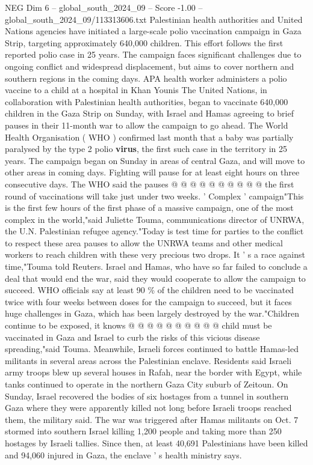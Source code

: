 \begin{textsample}{NEG Dim 6 – global\_south\_2024\_09 – Score -1.00 – global\_south\_2024\_09/113313606.txt}  \label{ex:f6_neg_039}
Palestinian health authorities and United Nations agencies have initiated a large-scale polio vaccination campaign in Gaza Strip, targeting approximately 640,000 children.
This effort follows the first reported polio case in 25 years.
The campaign faces significant challenges due to ongoing conflict and widespread displacement, but aims to cover northern and southern regions in the coming days.
APA health worker administers a polio vaccine to a child at a hospital in Khan Younis The United Nations, in collaboration with Palestinian health authorities, began to vaccinate 640,000 children in the Gaza Strip on Sunday, with Israel and Hamas agreeing to brief pauses in their 11-month war to allow the campaign to go ahead.
The World Health Organisation ( WHO ) confirmed last month that a baby was partially paralysed by the type 2 polio \textbf{virus}, the first such case in the territory in 25 years.
The campaign began on Sunday in areas of central Gaza, and will move to other areas in coming days.
Fighting will pause for at least eight hours on three consecutive days.
The WHO said the pauses @ @ @ @ @ @ @ @ @ @ the first round of vaccinations will take just under two weeks. ' Complex ' campaign"This is the first few hours of the first phase of a massive campaign, one of the most complex in the world,"said Juliette Touma, communications director of UNRWA, the U.N.
Palestinian refugee agency."Today is test time for parties to the conflict to respect these area pauses to allow the UNRWA teams and other medical workers to reach children with these very precious two drops.
It ' s a race against time,"Touma told Reuters.
Israel and Hamas, who have so far failed to conclude a deal that would end the war, said they would cooperate to allow the campaign to succeed.
WHO officials say at least 90 \% of the children need to be vaccinated twice with four weeks between doses for the campaign to succeed, but it faces huge challenges in Gaza, which has been largely destroyed by the war."Children continue to be exposed, it knows @ @ @ @ @ @ @ @ @ @ child must be vaccinated in Gaza and Israel to curb the risks of this vicious disease spreading,"said Touma.
Meanwhile, Israeli forces continued to battle Hamas-led militants in several areas across the Palestinian enclave.
Residents said Israeli army troops blew up several houses in Rafah, near the border with Egypt, while tanks continued to operate in the northern Gaza City suburb of Zeitoun.
On Sunday, Israel recovered the bodies of six hostages from a tunnel in southern Gaza where they were apparently killed not long before Israeli troops reached them, the military said.
The war was triggered after Hamas militants on Oct. 7 stormed into southern Israel killing 1,200 people and taking more than 250 hostages by Israeli tallies.
Since then, at least 40,691 Palestinians have been killed and 94,060 injured in Gaza, the enclave ' s health ministry says.

\end{textsample}
